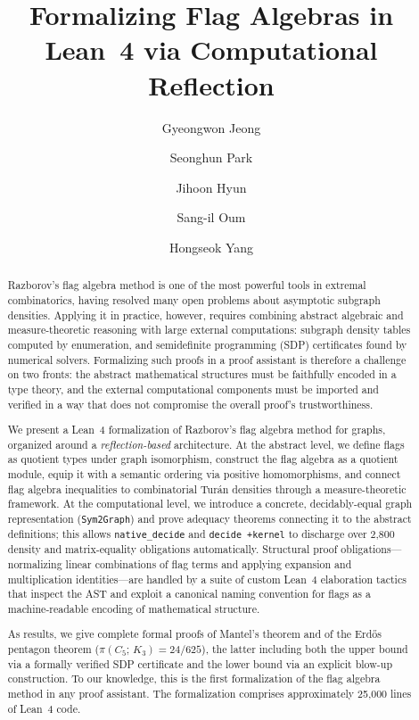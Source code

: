 \documentclass{article}
\title{Formalizing Flag Algebras in Lean~4 via Computational Reflection}
\date{}
\author[1]{Gyeongwon Jeong}
\author[1]{Seonghun Park}
\author[1]{Jihoon Hyun}
\author[2]{Sang-il Oum}
\author[3]{Hongseok Yang}
\affil[1]{School of Computing, KAIST, South Korea}
\affil[2]{Discrete Mathematics Group, Institute for Basic Science (IBS), South Korea}
\affil[3]{School of Computational Sciences, Korea Institute for Advanced Study (KIAS), South Korea}
\newcommand{\tdensity}[2]{\pi(#1;\,#2)}
\newcommand{\lean}[1]{\texttt{#1}}
\begin{document}
\maketitle

\begin{abstract}
Razborov's flag algebra method is one of the most powerful tools in extremal
combinatorics, having resolved many open problems about asymptotic subgraph
densities.  Applying it in practice, however, requires combining abstract algebraic
and measure-theoretic reasoning with large external computations: subgraph
density tables computed by enumeration, and semidefinite programming (SDP)
certificates found by numerical solvers.  Formalizing such proofs in a proof
assistant is therefore a challenge on two fronts: the abstract mathematical
structures must be faithfully encoded in a type theory, and the external
computational components must be imported and verified in a way that does not
compromise the overall proof's trustworthiness.

We present a Lean~4 formalization of Razborov's flag algebra method for
graphs, organized around a \emph{reflection-based} architecture.  At the
abstract level, we define flags as quotient types under graph isomorphism,
construct the flag algebra as a quotient module, equip it with a semantic
ordering via positive homomorphisms, and connect flag algebra inequalities to
combinatorial Turán densities through a measure-theoretic framework.  At the
computational level, we introduce a concrete, decidably-equal graph
representation (\lean{Sym2Graph}) and prove adequacy theorems connecting it to
the abstract definitions; this allows \lean{native\_decide} and \lean{decide
+kernel} to discharge over 2{,}800 density and matrix-equality obligations
automatically.  Structural proof obligations---normalizing linear combinations
of flag terms and applying expansion and multiplication identities---are handled
by a suite of custom Lean~4 elaboration tactics that inspect the AST and exploit
a canonical naming convention for flags as a machine-readable encoding of
mathematical structure.

As results, we give complete formal proofs of Mantel's theorem and of the
Erd\H{o}s pentagon theorem ($\tdensity{C_5}{K_3} = 24/625$), the latter including
both the upper bound via a formally verified SDP certificate and the lower bound
via an explicit blow-up construction.  To our knowledge, this is the first
formalization of the flag algebra method in any proof assistant.  The
formalization comprises approximately 25{,}000 lines of Lean~4 code.
\end{abstract}
\end{document}
